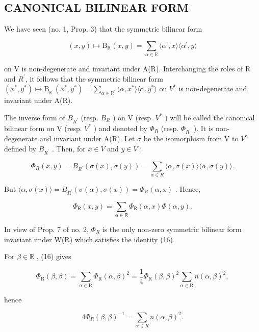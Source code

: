 \subsection{CANONICAL BILINEAR FORM}

We have seen (no. 1, Prop. 3) that the symmetric bilinear form

\[
(x, y) \mapsto \mathrm{B} _ {\mathrm{R}} (x, y) = \sum_ {\alpha \in \mathbb {R}} \langle \alpha^ {\prime}, x \rangle \langle \alpha^ {\prime}, y \rangle
\]

on V is non-degenerate and invariant under A(R). Interchanging the roles of R and \(R^{\prime}\), it follows that the symmetric bilinear form \((x^{*}, y^{*}) \mapsto \mathrm{B}_{\mathbb{R}^{\prime}}(x^{*}, y^{*}) = \sum_{\alpha \in \mathbb{R}^{\prime}} \langle \alpha, x^{*} \rangle \langle \alpha, y^{*} \rangle\) on \(V^{*}\) is non-degenerate and invariant under A(R).

The inverse form of \(B_{R^{\prime}}\) (resp. \(B_{R}\) ) on V (resp. \(V^{*}\) ) will be called the canonical bilinear form on V (resp. \(V^{*}\) ) and denoted by \(\Phi_{R}\) (resp. \(\Phi_{R^{\prime}}\) ). It is non-degenerate and invariant under A(R). Let \(\sigma\) be the isomorphism from V to \(V^{*}\) defined by \(B_{R^{\prime}}\) . Then, for \(x \in V\) and \(y \in V\) :

\[
\Phi_ {R} (x, y) = B _ {R ^ {\prime}} (\sigma (x), \sigma (y)) = \sum_ {\alpha \in R} \langle \alpha , \sigma (x) \rangle \langle \alpha , \sigma (y) \rangle .
\]

But \(\langle \alpha, \sigma(x) \rangle = B_{R^{\prime}}(\sigma(\alpha), \sigma(x)) = \Phi_R(\alpha, x)\) . Hence,

\[
\Phi_ {\mathsf {R}} (x, y) = \sum_ {\alpha \in \mathsf {R}} \Phi_ {\mathsf {R}} (\alpha , x) \Phi (\alpha , y).\tag{16}
\]

In view of Prop. 7 of no. 2, \(\Phi_{R}\) is the only non-zero symmetric bilinear form invariant under W(R) which satisfies the identity (16).

For \(\beta \in \mathbb{R}\) , (16) gives

\[
\varPhi_ {\mathrm{R}} (\beta , \beta) = \sum_ {\alpha \in \mathrm{R}} \varPhi_ {\mathrm{R}} (\alpha , \beta) ^ {2} = \frac {1}{4} \varPhi_ {\mathrm{R}} (\beta , \beta) ^ {2} \sum_ {\alpha \in \mathrm{R}} n (\alpha , \beta) ^ {2},
\]

hence

\[
4 \Phi_ {R} (\beta , \beta) ^ {- 1} = \sum_ {\alpha \in R} n (\alpha , \beta) ^ {2}.\tag{17}
\]

